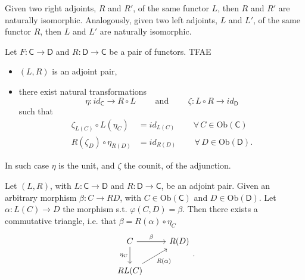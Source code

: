 \begin{prop}
	Given two right adjoints, $R$ and $R'$, of the same functor $L$,
	then $R$ and $R'$ are naturally isomorphic.
	Analogously, given two left adjoints, $L$ and $L'$, of the same functor $R$,
	then $L$ and $L'$ are naturally isomorphic.
\end{prop} 

\begin{prop}
	Let $F\colon \mathsf{C} \to \mathsf{D}$ and $R\colon \mathsf{D} \to \mathsf{C}$ be a pair of functors.
	TFAE
	\begin{itemize}
		\item $\left(L, R\right)$ is an adjoint pair,
		\item there exist natural transformations
			\begin{equation}
			\eta\colon id_{\mathsf{C}} \to R \circ L \qquad \text{ and }\qquad \zeta\colon L \circ R \to id_{\mathsf{D}}
			\end{equation} 
			such that
			\begin{align}
				\zeta_{L(C)} \circ L(\eta_C) &= id_{L(C)} \qquad
				\,\forall\, C \in \mathrm{Ob} \left(\mathsf{C}\right)\\
				R(\zeta_D) \circ \eta_{R(D)} &= id_{R(D)} \qquad
				\,\forall\, D \in \mathrm{Ob} \left(\mathsf{D}\right)
			.\end{align} 
	\end{itemize}
	In such case $\eta$ is the unit, and $\zeta$ the counit, of the adjunction.
\end{prop} 

\begin{rem}
	Let $\left(L, R\right)$, with $L\colon \mathsf{C} \to \mathsf{D}$ and $R\colon \mathsf{D} \to \mathsf{C}$, be an adjoint pair.
	Given an arbitrary morphism $\beta\colon C \to RD$, with $C \in \mathrm{Ob} \left(\mathsf{C}\right)$ and
	$D \in \mathrm{Ob} \left(\mathsf{D}\right)$.
	Let $\alpha\colon L(C) \to D$ the morphism s.t. $\varphi(C,D) = \beta$.
	Then there exists a commutative triangle, i.e. that $\beta = R(\alpha) \circ\eta_C$
	\begin{equation}
	\begin{tikzcd}
		C \arrow[r, "\beta", rightarrow] \arrow[d, "\eta_C"', rightarrow] &
		R(D)\\
		RL(C) \arrow[ru, "{R(\alpha)}"', rightarrow] &
	\end{tikzcd}
	.\end{equation} 
\end{rem} 

